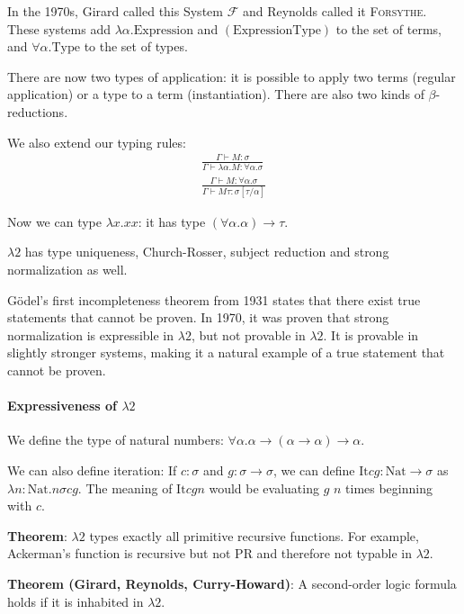 In the 1970s, Girard called this System $\mathcal{F}$ and Reynolds called it \textsc{Forsythe}.
These systems add $\lambda \alpha. \mathrm{Expression}$ and $(\mathrm{Expression} \mathrm{Type})$ to the set
of terms, and $\forall \alpha. \mathrm{Type}$ to the set of types.

There are now two types of application: it is possible to apply two terms (regular application)
or a type to a term (instantiation). There are also two kinds of $\beta$-reductions.

We also extend our typing rules:
\[
\begin{array}{c}
\frac{\Gamma \vdash M : \sigma}{\Gamma \vdash \lambda \alpha. M : \forall \alpha. \sigma} \\

\frac{\Gamma \vdash M : \forall \alpha. \sigma}{\Gamma \vdash M \tau : \sigma[\tau/\alpha]}
\end{array}
\]

Now we can type $\lambda x. x x$: it has type $(\forall \alpha. \alpha) \to \tau$.

$\lambda2$ has type uniqueness, Church-Rosser, subject reduction and strong normalization as well.

G\"odel's first incompleteness theorem from 1931 states that there exist true statements that cannot be proven.
In 1970, it was proven that strong normalization is expressible in $\lambda2$, but not provable in $\lambda2$.
It is provable in slightly stronger systems, making it a natural example of a true statement that cannot be proven.

\paragraph{Expressiveness of $\lambda2$}
We define the type of natural numbers: $\forall \alpha. \alpha \to (\alpha \to \alpha) \to \alpha$.

We can also define iteration: If $c : \sigma$ and $g: \sigma \to \sigma$, we can define $\mathrm{It} c g : \mathrm{Nat} \to \sigma$
as $\lambda n: \mathrm{Nat}. n \sigma c g$. The meaning of $\mathrm{It} c g n$ would be evaluating $g$ $n$ times beginning with $c$.

\textbf{Theorem}: $\lambda2$ types exactly all primitive recursive functions. For example, Ackerman's function is
recursive but not PR and therefore not typable in $\lambda2$.

\textbf{Theorem (Girard, Reynolds, Curry-Howard)}: A second-order logic formula holds if it is inhabited in $\lambda 2$.

